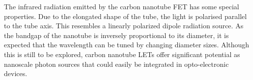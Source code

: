The infrared radiation emitted by the carbon nanotube FET has some special properties. Due to the elongated shape of the tube, the light is polarised parallel to the tube axis. This resembles a linearly polarized dipole radiation source. As the bandgap of the nanotube is inversely proportional to its diameter, it is expected that the wavelength can be tuned by changing diameter sizes. Although this is still to be explored, carbon nanotube LETs offer significant potential as nanoscale photon sources that could easily be integrated in opto-electronic devices.


